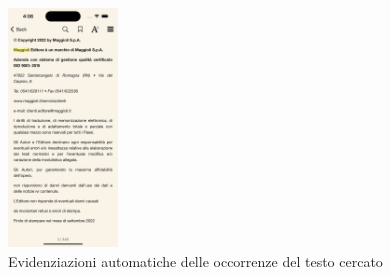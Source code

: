 \begin{multicols}{3}
    \begin{figure}[H]
        \centering
        \includegraphics[width=0.26\textwidth]{img/ricerca_testo2_ios.png}
        \caption{Evidenziazioni automatiche delle occorrenze del testo cercato}
        \label{ricerca_testo2-ios}
    \end{figure}
\end{multicols}